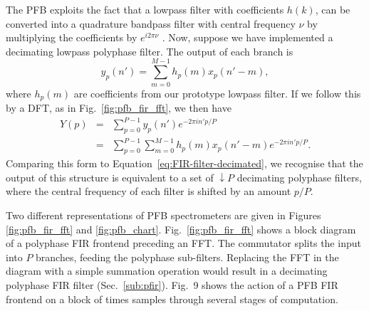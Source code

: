 \documentclass{ws-rv961x669}
\begin{document}
The PFB exploits the fact that a lowpass filter with coefficients $h(k)$, can be converted into a quadrature bandpass filter with central frequency $\nu$ by multiplying the coefficients by $e^{i 2\pi \nu}$ . 
Now, suppose we have implemented a decimating lowpass polyphase filter. The output of each branch is 
\begin{equation}
y_{p}(n')=\sum_{m=0}^{M-1}h_{p}(m)x_{p}(n'-m),
\end{equation}
where $h_{p}(m)$ are coefficients from our prototype lowpass filter. If we follow this by a DFT, as in Fig.~\ref{fig:pfb_fir_fft}, we then have 
\begin{eqnarray}
Y(p) & = & \sum_{p=0}^{P-1}y_{p}(n')e^{-2\pi in'p/P}\\
 & = & \sum_{p=0}^{P-1}\sum_{m=0}^{M-1}h_{p}(m)x_{p}(n'-m)e^{-2\pi in'p/P}.
\end{eqnarray}
Comparing this form to Equation~\ref{eq:FIR-filter-decimated}, we recognise that the output
of this structure is equivalent to a set of $\downarrow P$ decimating polyphase filters,
where the central frequency of each filter is shifted by an amount $p/P$. 

Two different representations of PFB spectrometers are given in Figures \ref{fig:pfb_fir_fft} and \ref{fig:pfb_chart}. Fig.~\ref{fig:pfb_fir_fft} shows a block diagram of a polyphase FIR frontend preceding an FFT. The commutator splits the input into $P$ branches, feeding the polyphase sub-filters. Replacing the FFT in the diagram with a simple summation operation would result in a decimating polyphase FIR filter (Sec.~\ref{sub:pfir}). Fig.~9 shows the action of a PFB FIR frontend on a block of times samples through several stages of computation.
\end{document}
